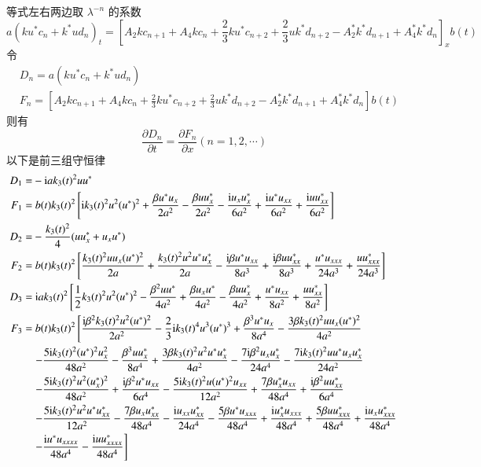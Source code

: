 等式左右两边取 $\lambda^{-n}$ 的系数
\begin{equation}
  a(ku^{*}c_{n} + k^{*}ud_{n})_{t} = \left[A_{2}kc_{n+1} + A_{4}kc_{n} + \frac{2}{3}ku^{*}c_{n+2} + \frac{2}{3}uk^{*}d_{n+2} - A_{2}^{*}k^{*}d_{n+1} + A_{4}^{*}k^{*}d_{n}\right]_{x}b(t)
\end{equation}
令
\begin{align}
  & D_{n} = a(ku^{*}c_{n} + k^{*}ud_{n}) \\
  & F_{n} = \left[A_{2}kc_{n+1} + A_{4}kc_{n} + \frac{2}{3}ku^{*}c_{n+2} + \frac{2}{3}uk^{*}d_{n+2} - A_{2}^{*}k^{*}d_{n+1} + A_{4}^{*}k^{*}d_{n}\right]b(t)
\end{align}
则有
\begin{equation}
  \frac{\partial D_{n}}{\partial t} = \frac{\partial F_{n}}{\partial x} (n = 1, 2, \cdots)
\end{equation}
以下是前三组守恒律
\begin{align}
  D_{1} =& -\mathrm{i}ak_3(t)^{2} uu^{*} \\
  F_{1} =&\ b(t)k_3(t)^{2} \left[\mathrm{i}k_3(t)^{2}u^2(u^*)^2 + \frac{\beta u^{*}u_{x}}{2a^{2}} - \frac{\beta uu^{*}_{x}}{2a^{2}} - \frac{\mathrm{i}u_{x}u^{*}_{x}}{6a^{2}} + \frac{\mathrm{i}u^{*}u_{xx}}{6a^{2}} + \frac{\mathrm{i}uu^{*}_{xx}}{6a^{2}} \right] \\
  D_{2} =& -\frac{k_{3}(t)^{2}}{4}(uu^{*}_{x} + u_{x}u^{*}) \\
  F_{2} =&\ b(t)k_3(t)^{2} \left[\frac{k_3(t)^{2}uu_x(u^*)^2}{2a} + \frac{k_3(t)^2u^2u^*u^*_x}{2a} -\frac{\mathrm{i}\beta u^*u_{xx}}{8a^3} + \frac{\mathrm{i}\beta uu^*_{xx}}{8a^3} + \frac{u^*u_{xxx}}{24a^3} + \frac{uu^*_{xxx}}{24a^3}  \right] \\
  D_{3} =&\ \mathrm{i}ak_3(t)^2\left[\frac{1}{2}k_3(t)^2u^2(u^*)^2 - \frac{\beta^2 uu^*}{4a^2} + \frac{\beta u_xu^*}{4a^2} - \frac{\beta uu^*_x}{4a^2} + \frac{u^*u_{xx}}{8a^2} + \frac{uu^*_{xx}}{8a^2}\right] \\
  F_{3} =&\ b(t)k_3(t)^{2} \left[ \frac{\mathrm{i}\beta^2k_3(t)^2u^2(u^*)^2}{2a^2} - \frac{2}{3}\mathrm{i}k_3(t)^4u^3(u^*)^3 + \frac{\beta^3 u^*u_x}{8a^4} - \frac{3\beta k_3(t)^2uu_x(u^*)^2}{4a^2} \right. \notag \\
  & \left.- \frac{5\mathrm{i}k_3(t)^2(u^*)^2u_x^2}{48a^2} - \frac{\beta^3uu^*_x}{8a^4} + \frac{3\beta k_3(t)^2u^2u^*u^*_x}{4a^2} - \frac{7\mathrm{i}\beta^2u_xu^*_x}{24a^4} - \frac{7\mathrm{i}k_3(t)^2uu^*u_xu^*_x}{24a^2} \right. \notag\\
  & \left. -\frac{5\mathrm{i}k_3(t)^2u^2(u^*_x)^2}{48a^2} + \frac{\mathrm{i}\beta^2u^*u_{xx}}{6a^4} - \frac{5\mathrm{i}k_3(t)^2u(u^*)^2u_{xx}}{12a^2} + \frac{7\beta u^*_xu_{xx}}{48a^4} + \frac{\mathrm{i}\beta^2uu^*_{xx}}{6a^4} \right. \notag\\
  & \left.  - \frac{5\mathrm{i}k_3(t)^2u^2u^*u^*_{xx}}{12a^2} -\frac{7\beta u_xu^*_{xx}}{48a^4} - \frac{\mathrm{i}u_{xx}u^*_{xx}}{24a^4} - \frac{5\beta u^*u_{xxx}}{48a^4} + \frac{\mathrm{i}u^*_xu_{xxx}}{48a^4} + \frac{5\beta uu^*_{xxx}}{48a^4} + \frac{\mathrm{i}u_xu^*_{xxx}}{48a^4}  \right. \notag\\
  & \left. - \frac{\mathrm{i}u^*u_{xxxx}}{48a^4} - \frac{\mathrm{i}uu^*_{xxxx}}{48a^4} \right]
\end{align}


